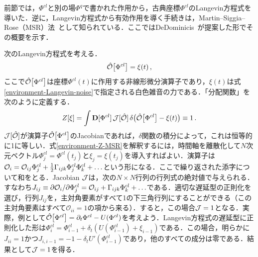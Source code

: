 \documentclass[a4paper,11pt]{ltjsarticle}
\def\D{\mathbf{D}}
\begin{document}
前節では，$\Phi^{cl}$と別の場$\Phi^q$で書かれた作用から，古典座標$\Phi^{cl}$のLangevin方程式を導いた．逆に，Langevin方程式から有効作用を導く手続きは，Martin--Siggia--Rose（MSR）法~\cite{MSR}として知られている．ここではDeDominicis~\cite{DeDominicis}が提案した形でその概要を示す．


次のLangevin方程式を考える．
\begin{equation}
\hat {\cal O}\big[\Phi^{cl}\big] = \xi(t)\, ,
\end{equation}ここで$\hat {\cal O}\big[\Phi^{cl}\big]$は座標$\Phi^{cl}(t)$に作用する非線形微分演算子であり，$\xi(t)$は式\eqref{environment-Langevin-noise}で指定される白色雑音の力である．「分配関数」を次のように定義する．
\begin{equation}\label{environment-Z-MSR}
Z[\xi]=\int\D[\Phi^{cl}]\, {\cal J}[\hat {\cal O }
]\,\delta\big(\hat {\cal O}\big[\Phi^{cl}\big] - \xi(t)\big) \equiv
1\, .
\end{equation}${\cal J}[\hat {\cal O}]$が演算子$\hat {\cal O}\big[\Phi^{cl}\big]$のJacobianであれば，$\delta$関数の積分によって，これは恒等的に1に等しい．式\eqref{environment-Z-MSR}を解釈するには，時間軸を離散化して$N$次元ベクトル$\Phi^{cl}_j=\Phi^{cl}(t_j)$と$\xi_j=\xi(t_j)$を導入すればよい．演算子は${\cal O}_i=\mathcal{O}_{ij}\Phi^{cl}_j+{1\over
2}\Gamma_{ijk}\Phi^{cl}_j\Phi^{cl}_k +\ldots$という形になる．ここで繰り返された添字について和をとる．Jacobian ${\cal J}$は，次の$N\times N$行列の行列式の絶対値で与えられる．すなわち$J_{ij}\equiv
\partial {\cal O}_i/ \partial\Phi^{cl}_j=
\mathcal{O}_{ij}+\Gamma_{ijk}\Phi^{cl}_k+\ldots$である．適切な遅延型の正則化を選び，行列$J_{ij}$を，主対角要素がすべて1の下三角行列にすることができる（この主対角要素はすべて$\mathcal{O}_{ii}=1$の項から来る）．すると，この場合${\cal J}=1$となる．実際，例として$\hat {\cal O}\big[\Phi^{cl}\big]=\partial_t\Phi^{cl}-U(\Phi^{cl})$を考えよう．Langevin方程式の遅延型に正則化した形は$\Phi^{cl}_{i}
=\Phi^{cl}_{i-1}+\delta_t(U(\Phi^{cl}_{i-1})+\xi_{i-1})$である．この場合，明らかに$J_{ii}=1$かつ$J_{i,i-1}=-1-\delta_t
U'(\Phi^{cl}_{i-1})$であり，他のすべての成分は零である．結果として${\cal J}=1$を得る．
\end{document}
